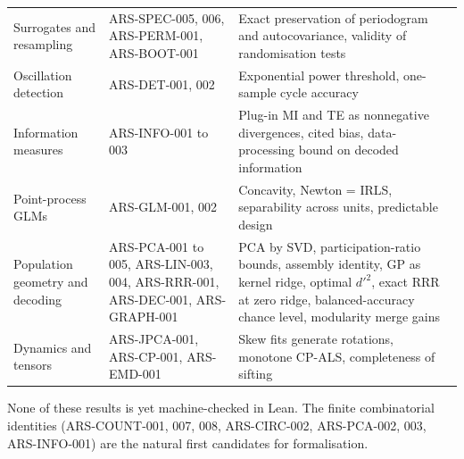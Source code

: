 \begin{longtable}{p{}p{}p{}}
Surrogates and resampling & ARS-SPEC-005, 006, ARS-PERM-001, ARS-BOOT-001 & Exact preservation of periodogram and autocovariance, validity of randomisation tests\\
Oscillation detection & ARS-DET-001, 002 & Exponential power threshold, one-sample cycle accuracy\\
Information measures & ARS-INFO-001 to 003 & Plug-in MI and TE as nonnegative divergences, cited bias, data-processing bound on decoded information\\
Point-process GLMs & ARS-GLM-001, 002 & Concavity, Newton = IRLS, separability across units, predictable design\\
Population geometry and decoding & ARS-PCA-001 to 005, ARS-LIN-003, 004, ARS-RRR-001, ARS-DEC-001, ARS-GRAPH-001 & PCA by SVD, participation-ratio bounds, assembly identity, GP as kernel ridge, optimal $d'^2$, exact RRR at zero ridge, balanced-accuracy chance level, modularity merge gains\\
Dynamics and tensors & ARS-JPCA-001, ARS-CP-001, ARS-EMD-001 & Skew fits generate rotations, monotone CP-ALS, completeness of sifting\\
\bottomrule\end{longtable}
None of these results is yet machine-checked in Lean. The finite combinatorial identities (ARS-COUNT-001, 007, 008, ARS-CIRC-002, ARS-PCA-002, 003, ARS-INFO-001) are the natural first candidates for formalisation.
